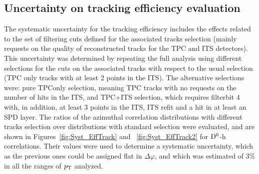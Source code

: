 \subsection{Uncertainty on tracking efficiency evaluation}
The systematic uncertainty for the tracking efficiency includes the effects related to the set of filtering cuts defined for the associated tracks selection (mainly requests on the quality of reconstructed tracks for the TPC and ITS detectors). This uncertainty was determined by repeating the full analysis using different selections for the cuts on the associated tracks with respect to the usual selection (TPC only tracks with at least 2 points in the ITS). The alternative selections were: pure TPConly selection, meaning TPC tracks with no requests on the number of hits in the ITS, and TPC+ITS selection, which requires filterbit 4 with, in addition, at least 3 points in the ITS, ITS refit and a hit in at least an SPD layer. The ratios of the azimuthal correlation distributions with different tracks selection over distributions with standard selection were evaluated, and are shown in Figures~\ref{fig:Syst_EffTrack} and ~\ref{fig:Syst_EffTrack2} for ${\rm D^0}$-h correlations. Their values were used to determine a systematic uncertainty, which as the previous ones could be assigned flat in $\Delta\varphi$, and which was estimated of 3\% in all the ranges of $p_{\rm T}$ analyzed.

